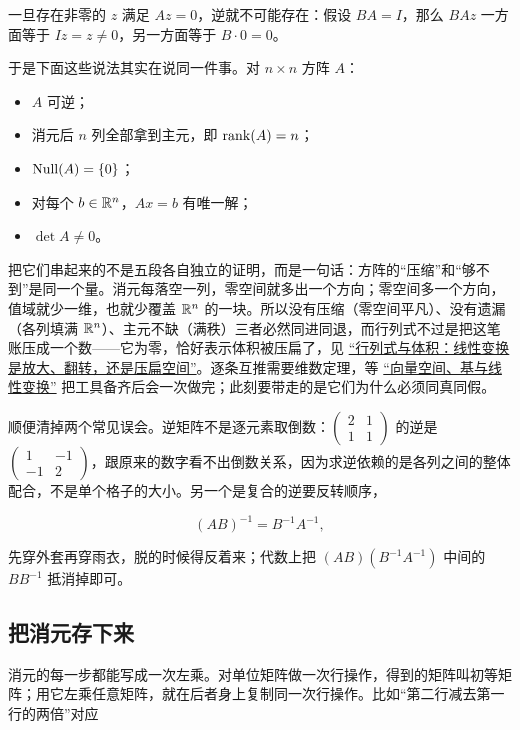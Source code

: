 一旦存在非零的 \(z\) 满足 \(Az=0\)，逆就不可能存在：假设 \(BA=I\)，那么 \(BAz\) 一方面等于 \(Iz=z\neq0\)，另一方面等于 \(B\cdot0=0\)。

于是下面这些说法其实在说同一件事。对 \(n\times n\) 方阵 \(A\)：

\begin{itemize}
\tightlist
\item \(A\) 可逆；
\item 消元后 \(n\) 列全部拿到主元，即 \(\operatorname{rank}(A)=n\)；
\item \(\operatorname{Null}(A)=\left\{0\right\}\)；
\item 对每个 \(b\in\mathbb{R}^n\)，\(Ax=b\) 有唯一解；
\item \(\det A\neq0\)。
\end{itemize}

把它们串起来的不是五段各自独立的证明，而是一句话：方阵的``压缩''和``够不到''是同一个量。消元每落空一列，零空间就多出一个方向；零空间多一个方向，值域就少一维，也就少覆盖 \(\mathbb{R}^n\) 的一块。所以没有压缩（零空间平凡）、没有遗漏（各列填满 \(\mathbb{R}^n\)）、主元不缺（满秩）三者必然同进同退，而行列式不过是把这笔账压成一个数——它为零，恰好表示体积被压扁了，见 \hyperref[sec:03-Linear-Algebra/04-Determinants/01]{``行列式与体积：线性变换是放大、翻转，还是压扁空间''}。逐条互推需要维数定理，等 \hyperref[ch:017]{``向量空间、基与线性变换''} 把工具备齐后会一次做完；此刻要带走的是它们为什么必须同真同假。

顺便清掉两个常见误会。逆矩阵不是逐元素取倒数：\(\begin{pmatrix}2&1\\1&1\end{pmatrix}\) 的逆是 \(\begin{pmatrix}1&-1\\-1&2\end{pmatrix}\)，跟原来的数字看不出倒数关系，因为求逆依赖的是各列之间的整体配合，不是单个格子的大小。另一个是复合的逆要反转顺序，

\[
(AB)^{-1}=B^{-1}A^{-1},
\]

先穿外套再穿雨衣，脱的时候得反着来；代数上把 \((AB)(B^{-1}A^{-1})\) 中间的 \(BB^{-1}\) 抵消掉即可。

\subsection{把消元存下来}

消元的每一步都能写成一次左乘。对单位矩阵做一次行操作，得到的矩阵叫初等矩阵；用它左乘任意矩阵，就在后者身上复制同一次行操作。比如``第二行减去第一行的两倍''对应

